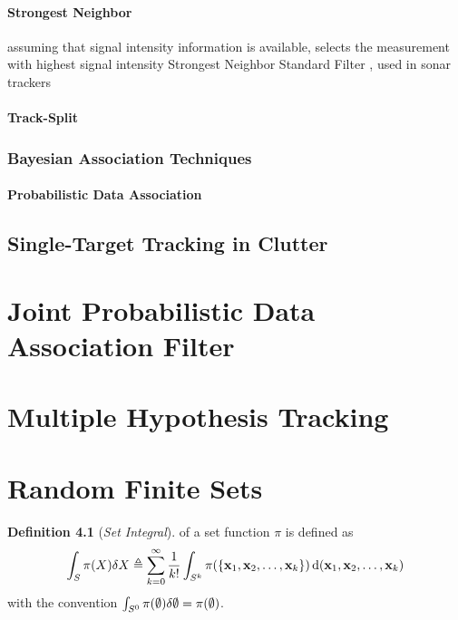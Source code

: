 \documentclass[a4paper,10pt]{scrreprt}
\theoremstyle{theorem}
\theoremstyle{definition}
\newtheorem{defn}{Definition}
\begin{document}
\subsubsection{Strongest Neighbor}
assuming that signal intensity information is available, selects the measurement with highest signal intensity
Strongest Neighbor Standard Filter \citep{Bar-Shalom1995}, used in sonar trackers

\subsubsection{Track-Split}
\subsection{Bayesian Association Techniques}
\subsubsection{Probabilistic Data Association}
\section{Single-Target Tracking in Clutter}\label{sec:single-target_tracking_in_clutter}

\chapter{Joint Probabilistic Data Association Filter}\label{ch:jpda_filter}
\chapter{Multiple Hypothesis Tracking}\label{ch:multiple_hypothesis_tracking}




\chapter{Random Finite Sets}\label{ch:random_finite_sets}

\begin{defn}[\emph{Set Integral}]
	 of a set function \( \pi \) is defined as
	\begin{equation}\label{eq:set_integral}
		\int_S \pi(X) \dsx[X] \triangleq \sum_{k=0}^{\infty}\frac{1}{k!}\int_{S^k} \pi(\Bqty{\inVar_1, \inVar_2, \ldots, \inVar_k}) \dx[(\inVar_1, \inVar_2, \ldots, \inVar_k)]
	\end{equation}
	with the convention \( \int_{S^0} \pi(\emptyset) \dsx[\emptyset] = \pi(\emptyset) \).
\end{defn}
\end{document}
